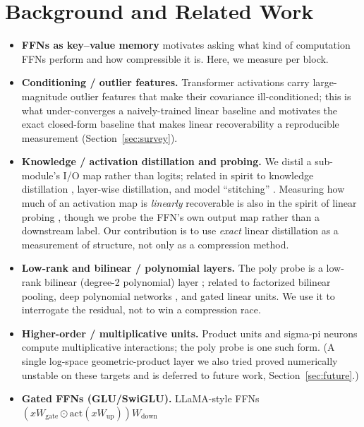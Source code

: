 \documentclass{article}
\begin{document}
\section{Background and Related Work}
\label{sec:background}

\begin{itemize}
\item \textbf{FFNs as key--value memory} \citep{geva2021kv} motivates asking what kind of computation FFNs perform and how compressible it is. Here, we measure
  per block.
\item \textbf{Conditioning / outlier features.} Transformer activations carry
  large-magnitude outlier features \citep{dettmers2022llmint8} that make their covariance
  ill-conditioned; this is what under-converges a naively-trained linear baseline and
  motivates the exact closed-form baseline that makes linear recoverability a reproducible
  measurement (Section~\ref{sec:survey}).
\item \textbf{Knowledge / activation distillation and probing.} We distil a sub-module's I/O
  map rather than logits; related in spirit to knowledge distillation
  \citep{hinton2015distilling}, layer-wise distillation, and model ``stitching''
  \citep{bansal2021stitching}. Measuring how much of an activation map is \emph{linearly}
  recoverable is also in the spirit of linear probing \citep{alain2017probes}, though we probe
  the FFN's own output map rather than a downstream label. Our contribution is to use
  \emph{exact} linear distillation as a measurement of structure, not only as a compression
  method.
\item \textbf{Low-rank and bilinear / polynomial layers.} The poly probe is a low-rank bilinear
  (degree-2 polynomial) layer \citep{rendle2010fm}; related to factorized bilinear pooling, deep
  polynomial networks \citep{chrysos2022pnets}, and gated linear units. We use it to interrogate
  the residual, not to win a compression race.
\item \textbf{Higher-order / multiplicative units.} Product units and sigma-pi neurons
  \citep{rumelhart1986pdp, shin1991pisigma, jayakumar2020multiplicative} compute
  multiplicative interactions; the poly probe is one such form. (A single log-space
  geometric-product layer we also tried proved numerically unstable on these targets and is
  deferred to future work, Section~\ref{sec:future}.)
\item \textbf{Gated FFNs (GLU/SwiGLU).} LLaMA-style FFNs
  $(xW_{\mathrm{gate}}\odot \mathrm{act}(xW_{\mathrm{up}}))W_{\mathrm{down}}$

\end{itemize}
\end{document}
